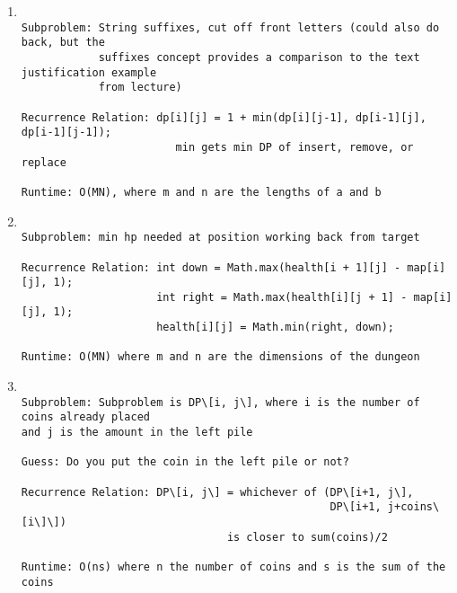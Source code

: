 \documentclass{article}
\begin{document}
\begin{enumerate}

\item
\begin{lstlisting}

Subproblem: String suffixes, cut off front letters (could also do back, but the 
            suffixes concept provides a comparison to the text justification example 
            from lecture)

Recurrence Relation: dp[i][j] = 1 + min(dp[i][j-1], dp[i-1][j], dp[i-1][j-1]); 
                        min gets min DP of insert, remove, or replace
                                       
Runtime: O(MN), where m and n are the lengths of a and b

\end{lstlisting}

\item
\begin{lstlisting}

Subproblem: min hp needed at position working back from target

Recurrence Relation: int down = Math.max(health[i + 1][j] - map[i][j], 1);
                     int right = Math.max(health[i][j + 1] - map[i][j], 1);
                     health[i][j] = Math.min(right, down);

Runtime: O(MN) where m and n are the dimensions of the dungeon

\end{lstlisting}

\item
\begin{lstlisting}

Subproblem: Subproblem is DP\[i, j\], where i is the number of coins already placed 
and j is the amount in the left pile

Guess: Do you put the coin in the left pile or not?

Recurrence Relation: DP\[i, j\] = whichever of (DP\[i+1, j\], 
                                                DP\[i+1, j+coins\[i\]\])
                                is closer to sum(coins)/2

Runtime: O(ns) where n the number of coins and s is the sum of the coins

\end{lstlisting}

\end{enumerate}
\end{document}
